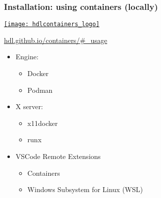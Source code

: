 \documentclass[xcolor={usenames,dvipsnames,svgnames}]{beamer}
\begin{document}
\begin{frame}
\frametitle{Installation: using containers (locally)}
\begin{center}
\begin{minipage}{.2\linewidth}
\href{https://github.com/hdl}{\texttt{[image: hdlcontainers\_logo]}}
\end{minipage}
\begin{minipage}{.45\linewidth}
\href{https://hdl.github.io/containers/\#_usage}{hdl.github.io/containers/\#\_usage}
\end{minipage}
\end{center}

\vfill

\begin{itemize}
\item Engine:
  \begin{itemize}
    \item Docker \href{https://www.docker.com/}{\faGlobe}
    \item Podman \href{https://podman.io/}{\faGlobe}
  \end{itemize}

\vfill

\item X server:
  \begin{itemize}
    \item x11docker \href{https://github.com/mviereck/x11docker/}{\faGithub}
    \item runx \href{https://github.com/mviereck/runx/}{\faGithub}
  \end{itemize}

\vfill

\item VSCode Remote Extensions
  \begin{itemize}
    \item Containers \href{https://marketplace.visualstudio.com/items?itemName=ms-vscode-remote.remote-containers}{\faWindows}
    \item Windows Subsystem for Linux (WSL) \href{https://marketplace.visualstudio.com/items?itemName=ms-vscode-remote.remote-wsl}{\faWindows}
  \end{itemize}
\end{itemize}
\vfill
\end{frame}
\end{document}
